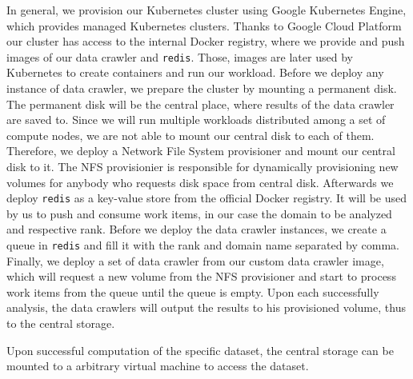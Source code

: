 In general, we provision our Kubernetes cluster using Google Kubernetes Engine, which provides managed Kubernetes clusters. Thanks to Google Cloud Platform our cluster has access to the internal Docker registry, where we provide and push images of our data crawler and \texttt{redis}. Those, images are later used by Kubernetes to create containers and run our workload. Before we deploy any instance of data crawler, we prepare the cluster by mounting a permanent disk. The permanent disk will be the central place, where results of the data crawler are saved to. Since we will run multiple workloads distributed among a set of compute nodes, we are not able to mount our central disk to each of them. Therefore, we deploy a Network File System provisioner and mount our central disk to it. The NFS provisionier is responsible for dynamically provisioning new volumes for anybody who requests disk space from central disk. Afterwards we deploy \texttt{redis} as a key-value store from the official Docker registry. It will be used by us to push and consume work items, in our case the domain to be analyzed and respective rank. Before we deploy the data crawler instances, we create a queue in \texttt{redis} and fill it with the rank and domain name separated by comma. Finally, we deploy a set of data crawler from our custom data crawler image, which will request a new volume from the NFS provisioner and start to process work items from the queue until the queue is empty. Upon each successfully analysis, the data crawlers will output the results to his provisioned volume, thus to the central storage.

Upon successful computation of the specific dataset, the central storage can be mounted to a arbitrary virtual machine to access the dataset. 

